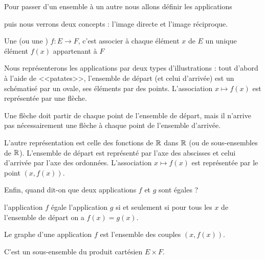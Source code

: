 





\debuttexte

\diapo

\change

\change

Pour passer d'un ensemble à un autre nous allons 
définir les applications

\change

puis nous verrons deux concepts : l'image directe et l'image réciproque.


\diapo

Une  (ou une ) $f : E \to F$,
c'est associer à chaque élément $x$ de $E$ un unique élément $f(x)$ appartenant à $F$

\change

Nous représenterons les applications par deux types d'illustrations :
tout d'abord à l'aide de <<patates>>, l'ensemble de départ (et celui d'arrivée) 
est un
schématisé par un ovale, ses éléments par des points. 
L'association $x \mapsto f(x)$ est représentée par une flèche.

Une flèche doit partir de chaque point de l'ensemble de départ, mais
il n'arrive pas nécessairement une flèche à chaque point de l'ensemble d'arrivée.


\change

L'autre représentation est celle des fonctions de $\mathbb{R}$ dans $\mathbb{R}$ (ou de sous-ensembles de $\mathbb{R}$).
L'ensemble de départ est représenté par l'axe des abscisses et celui d'arrivée par l'axe des ordonnées.
L'association $x \mapsto f(x)$ est représentée par le point $(x,f(x))$.


\change

Enfin, quand dit-on que deux applications $f$ et $g$ sont égales ?

l'application $f$ égale l'application $g$ si et seulement si pour tous les $x$ de l'ensemble de départ on a $f(x)=g(x)$.


\diapo

Le graphe d'une application $f$ est l'ensemble des couples $(x,f(x))$.

C'est un sous-ensemble du produit cartésien $E \times F$.

